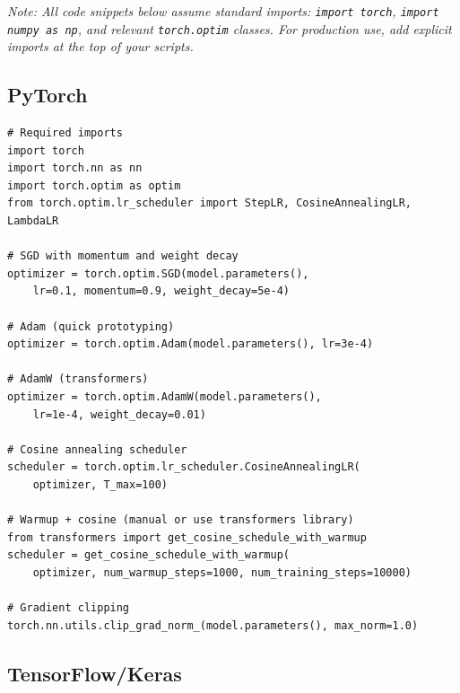 \documentclass[../main.tex]{subfiles}
\begin{document}
\textit{Note: All code snippets below assume standard imports: \texttt{import torch}, \texttt{import numpy as np}, and relevant \texttt{torch.optim} classes. For production use, add explicit imports at the top of your scripts.}

\subsection{PyTorch}

\begin{tcolorbox}[colback=white, colframe=black!50, boxrule=0.5pt]
\begin{verbatim}
# Required imports
import torch
import torch.nn as nn
import torch.optim as optim
from torch.optim.lr_scheduler import StepLR, CosineAnnealingLR, LambdaLR

# SGD with momentum and weight decay
optimizer = torch.optim.SGD(model.parameters(),
    lr=0.1, momentum=0.9, weight_decay=5e-4)

# Adam (quick prototyping)
optimizer = torch.optim.Adam(model.parameters(), lr=3e-4)

# AdamW (transformers)
optimizer = torch.optim.AdamW(model.parameters(),
    lr=1e-4, weight_decay=0.01)

# Cosine annealing scheduler
scheduler = torch.optim.lr_scheduler.CosineAnnealingLR(
    optimizer, T_max=100)

# Warmup + cosine (manual or use transformers library)
from transformers import get_cosine_schedule_with_warmup
scheduler = get_cosine_schedule_with_warmup(
    optimizer, num_warmup_steps=1000, num_training_steps=10000)

# Gradient clipping
torch.nn.utils.clip_grad_norm_(model.parameters(), max_norm=1.0)
\end{verbatim}
\end{tcolorbox}

\subsection{TensorFlow/Keras}
\end{document}
